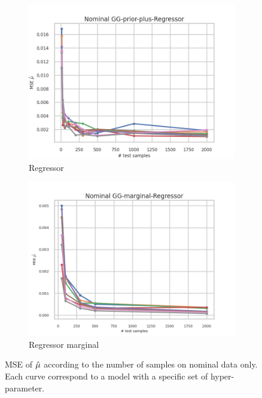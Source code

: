 \begin{figure}[ht!]
  \begin{subfigure}[t]{0.49\linewidth}
    \includegraphics[width=\linewidth]{COMPARE/GG-prior-plus/Regressor/profusion_nominal_n_samples_mse.png}
    \caption{Regressor}
  \end{subfigure}%
  \hfill
  \begin{subfigure}[t]{0.49\linewidth}
    \includegraphics[width=\linewidth]{COMPARE/GG-marginal/Regressor/profusion_nominal_n_samples_mse.png}
    \caption{Regressor marginal}
  \end{subfigure}


  \caption{MSE of $\hat\mu$ according to the number of samples on nominal data only. Each curve correspond to a model with a specific set of hyper-parameter.}
  \label{fig:gg_baseline_nominal_n_samples_mse}
\end{figure}


